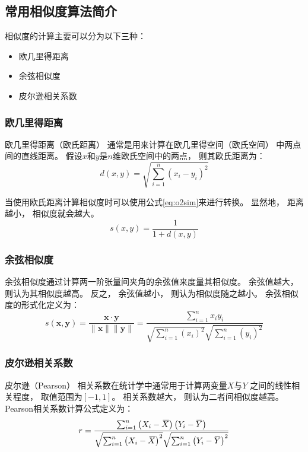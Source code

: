 \subsection{常用相似度算法简介}

相似度的计算主要可以分为以下三种\cite{heJiYuJuanJiShenJingWangLuoDeYinLeTuiJianXiTong2019}：
\begin{itemize}
    \item 欧几里得距离
    \item 余弦相似度
    \item 皮尔逊相关系数
\end{itemize}

\subsubsection{欧几里得距离}

欧几里得距离（欧氏距离）
通常是用来计算在欧几里得空间（欧氏空间）
中两点间的直线距离。
假设$x$和$y$是$n$维欧氏空间中的两点，
则其欧氏距离为：
\begin{equation}
    d(x,y)=\sqrt{ \sum_{i=1}^n {\left( x_i - y_i \right)}^2}
\end{equation}

当使用欧氏距离计算相似度时可以使用公式\cref{eq:o2sim}来进行转换。
显然地，
距离越小，
相似度就会越大。
\begin{equation}
    \label{eq:o2sim}
    s(x,y)=\frac{1}{1+d(x,y)}
\end{equation}

\subsubsection{余弦相似度}

余弦相似度通过计算两一阶张量间夹角的余弦值来度量其相似度。
余弦值越大，
则认为其相似度越高。
反之，
余弦值越小，
则认为相似度随之越小。
余弦相似度的形式化定义为：
\begin{equation}
    s(\mathbf{x},\mathbf{y})=
    \frac{\mathbf{x}\cdot\mathbf{y}}{\lVert\mathbf{x}\rVert\lVert\mathbf{y}\rVert}
    =\frac{\sum_{i=1}^n x_i y_i} {\sqrt{\sum_{i=1}^n{\left(x_i\right)}^2} \sqrt{\sum_{i=1}^n{\left(y_i\right)}^2}}
\end{equation}

\subsubsection{皮尔逊相关系数}

皮尔逊（Pearson）
相关系数在统计学中通常用于计算两变量$X$与$Y$
之间的线性相关程度，
取值范围为$\left[-1,1\right]$。
相关系数越大，
则认为二者间相似度越高。
Pearson相关系数计算公式定义为：
\begin{equation}
    r=\frac{\sum_{i=1}^n\left(X_i-\overbari{X}\right)\left(Y_i-\overbar{Y}\right)}{\sqrt{\sum_{i=1}^n{\left(X_i-\overbari{X}\right)}^2}\sqrt{\sum_{i=1}^n{\left(Y_i-\overbar{Y}\right)}^2}}
\end{equation}
